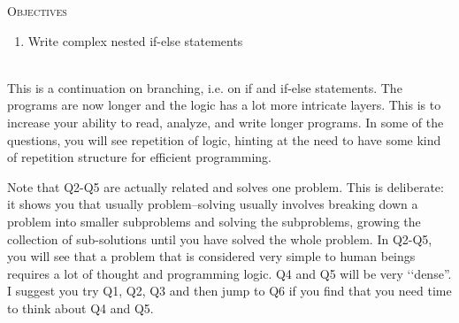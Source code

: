 


\renewcommand\TITLE{Assignment 7}
\usepackage{import}


\topmatter

\textsc{Objectives}
 \begin{enumerate}
   \item Write complex nested if-else statements
 \end{enumerate}
\mbox{}\\

This is a continuation on branching, i.e. on if and if-else statements. 
The programs are now longer and the logic has a lot more
intricate layers.
This is to increase your ability to read, analyze, and write longer programs.
In some of the questions, you will see repetition of logic, hinting
at the need to have some kind of repetition structure for 
efficient programming.

Note that Q2-Q5 are actually related and solves one problem.
This is deliberate: it shows you that usually problem--solving
usually involves breaking down a problem into smaller subproblems
and solving the subproblems, growing the collection of sub-solutions
until you have solved the whole problem.
In Q2-Q5, you will see that  
a problem that is considered
very simple to human beings requires 
a lot of thought and 
programming logic. 
Q4 and Q5 will be very \lq\lq dense''.
I suggest you try Q1, Q2, Q3 and then jump to Q6 if you find
that you need time to think about Q4 and Q5.



